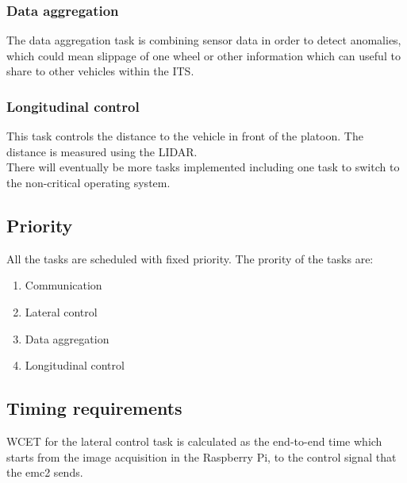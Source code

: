\subsubsection{Data aggregation}
The data aggregation task is combining sensor data in order to detect anomalies, which could mean slippage of one wheel or other information which can useful to share to other vehicles within the ITS.  
\subsubsection{Longitudinal control}
This task controls the distance to the vehicle in front of the platoon. The distance is measured using the LIDAR.\\
 
There will eventually be more tasks implemented including one task to switch to the non-critical operating system.

\subsection{Priority}
All the tasks are scheduled with fixed priority. The prority of the tasks are:

\begin{enumerate}
  \item Communication
  \item Lateral control
  \item Data aggregation
  \item Longitudinal control
\end{enumerate}


\subsection{Timing requirements}
WCET for the lateral control task is calculated as the end-to-end time which starts from the image acquisition in the Raspberry Pi, to the control signal that the emc2 sends. 